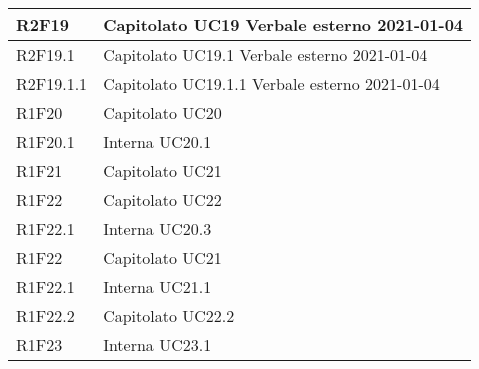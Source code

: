 \begin{center}
\begin{longtable}{|p{22mm}|p{22mm}|}
R2F19 &
Capitolato \newline
UC19 \newline
Verbale esterno 2021-01-04 \newline
\\
\hline

R2F19.1 &
Capitolato \newline
UC19.1 \newline
Verbale esterno 2021-01-04 \newline
\\
\hline

R2F19.1.1 &
Capitolato \newline
UC19.1.1 \newline
Verbale esterno 2021-01-04 \newline
\\
\hline

R1F20 &
Capitolato \newline
UC20 \newline
\\
\hline

R1F20.1 &
Interna \newline
UC20.1 \newline
\\
\hline

R1F21 &
Capitolato \newline
UC21 \newline
\\
\hline

R1F22 &
Capitolato \newline
UC22 \newline
\\
\hline

R1F22.1 &
Interna \newline
UC20.3 \newline
\\
\hline

R1F22 &
Capitolato \newline
UC21 \newline
\\
\hline

R1F22.1 &
Interna \newline
UC21.1 \newline
\\
\hline

R1F22.2 &
Capitolato \newline
UC22.2 \newline
\\
\hline

R1F23 &
Interna \newline
UC23.1 \newline
\\
\hline


\end{longtable}
\end{center}
